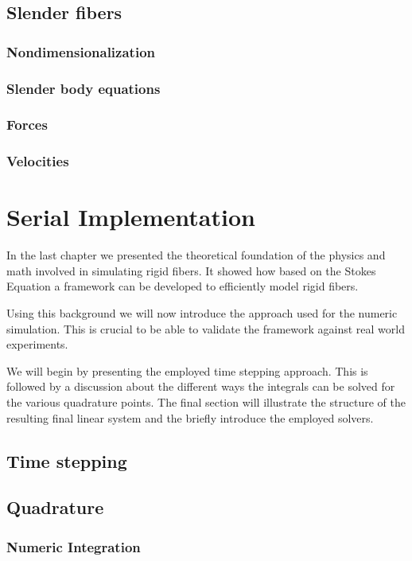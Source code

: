 \documentclass[a4paper,11pt]{kth-mag}
\begin{document}
\section{Slender fibers}


\subsection{Nondimensionalization}
\subsection{Slender body equations}
\subsection{Forces}
\subsection{Velocities}

\chapter{Serial Implementation}
\label{cha:serial_implementation}

In the last chapter we presented the theoretical foundation of the physics and math involved in simulating rigid fibers. It showed how based on the Stokes Equation a framework can be developed to efficiently model rigid fibers.

Using this background we will now introduce the approach used for the numeric simulation. This is crucial to be able to validate the framework against real world experiments.

We will begin by presenting the employed time stepping approach. This is followed by a discussion about the different ways the integrals can be solved for the various quadrature points. The final section will illustrate the structure of the resulting final linear system and the briefly introduce the employed solvers.

\section{Time stepping}
\label{sec:time_stepping}

\section{Quadrature}
\label{sec:quadrature}
\subsection{Numeric Integration}
\end{document}
